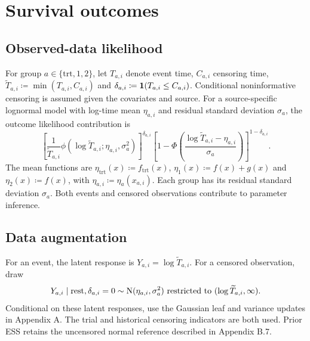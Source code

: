 \section{Survival outcomes}\label{sec:D}
\subsection{Observed-data likelihood}\label{sec:D.1}
For group $a\in\{\mathrm{trt},1,2\}$, let $T_{a,i}$ denote event time, $C_{a,i}$ censoring time, $\widetilde T_{a,i}\coloneqq \min(T_{a,i},C_{a,i})$ and $\delta_{a,i}\coloneqq \mathbf{1}(T_{a,i}\leq C_{a,i})$. Conditional noninformative censoring is assumed given the covariates and source. For a source-specific lognormal model with log-time mean $\eta_{a,i}$ and residual standard deviation $\sigma_a$, the outcome likelihood contribution is
\begin{equation}
\left[\frac{1}{\widetilde T_{a,i}}\phi(\log\widetilde T_{a,i};\eta_{a,i},\sigma_a^2)\right]^{\delta_{a,i}}
\left[1-\Phi\left(\frac{\log\widetilde T_{a,i}-\eta_{a,i}}{\sigma_a}\right)\right]^{1-\delta_{a,i}}.
\end{equation}
The mean functions are $\eta_{\mathrm{trt}}(x)\coloneqq f_{\mathrm{trt}}(x)$, $\eta_{1}(x)\coloneqq f(x)+g(x)$ and $\eta_{2}(x)\coloneqq f(x)$, with $\eta_{a,i}\coloneqq \eta_a(x_{a,i})$. Each group has its residual standard deviation $\sigma_a$. Both events and censored observations contribute to parameter inference.

\subsection{Data augmentation}\label{sec:D.2}
For an event, the latent response is $Y_{a,i}=\log\widetilde T_{a,i}$. For a censored observation, draw
\begin{equation}
Y_{a,i}\mid\text{rest},\delta_{a,i}=0\sim
\mathrm{N}(\eta_{a,i},\sigma_a^2)\text{ restricted to }(\log\widetilde T_{a,i},\infty).
\end{equation}
Conditional on these latent responses, use the Gaussian leaf and variance updates in Appendix A. The trial and historical censoring indicators are both used. Prior ESS retains the uncensored normal reference described in Appendix B.7.


